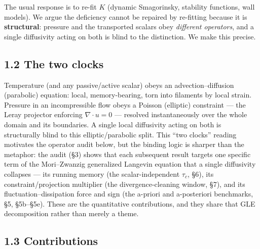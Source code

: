 \documentclass[aps,prfluids,preprint,superscriptaddress,nofootinbib]{revtex4-2}
\begin{document}
The usual response is to re-fit $K$ (dynamic Smagorinsky, stability functions, wall models). We argue the deficiency cannot be repaired by re-fitting because it is \textbf{structural}: pressure and the transported scalars obey \emph{different operators}, and a single diffusivity acting on both is blind to the distinction. We make this precise.

\subsection*{1.2 The two clocks}

Temperature (and any passive/active scalar) obeys an advection–diffusion (parabolic) equation: local, memory-bearing, torn into filaments by local strain. Pressure in an incompressible flow obeys a Poisson (elliptic) constraint — the Leray projector enforcing $\nabla \cdot u=0$ — resolved instantaneously over the whole domain and its boundaries. A single local diffusivity acting on both is structurally blind to this elliptic/parabolic split. This ``two clocks'' reading motivates the operator audit below, but the binding logic is sharper than the metaphor: the audit (§3) shows that each subsequent result targets one specific term of the Mori–Zwanzig generalized Langevin equation that a single diffusivity collapses — its running memory (the scalar-independent $\tau _{c}$, §6), its constraint/projection multiplier (the divergence-cleaning window, §7), and its fluctuation–dissipation force and sign (the a-priori and a-posteriori benchmarks, §5, §5b–§5e). These are the quantitative contributions, and they share that GLE decomposition rather than merely a theme.

\subsection*{1.3 Contributions}
\end{document}
